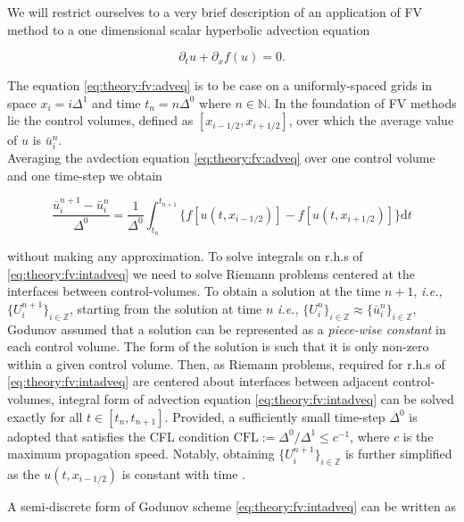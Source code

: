 \documentclass[11pt,a4paper,headinclude=true,DIV=14,BCOR=8mm,chapterprefix,listof=totoc,twoside,openright,abstracton]{scrbook}
\begin{document}
We will restrict ourselves to a very brief description of an application of FV method to a one dimensional scalar hyperbolic advection equation 

\begin{equation}
    \partial_t u + \partial_x f(u) = 0.
    \label{eq:theory:fv:adveq}
\end{equation}

The equation \ref{eq:theory:fv:adveq} is to be case on a uniformly-spaced grids in space $ x_i = i\Delta^1$ and time $t_n = n\Delta^0$ where $n\in\mathbb{N}$. In the foundation of FV methods lie the control volumes, defined as $[x_{i-1/2},x_{i+1/2}]$, over which the average value of $u$ is $\bar{u}_i ^n$. \\
Averaging the avdection equation \ref{eq:theory:fv:adveq} over one control volume and one time-step we obtain

\begin{equation}
    \frac{\bar{u}_{i}^{n+1}-\bar{u}_{i}^{n}}{\Delta^0} = \frac{1}{\Delta^0}\int_{t_n}^{t_{n+1}}\big\{f[u(t,x_{i-1/2})] - f[u(t,x_{i+1/2})]\big\}\text{d}t
    \label{eq:theory:fv:intadveq}
\end{equation}

without making any approximation. To solve integrals on r.h.s of \ref{eq:theory:fv:intadveq} we need to solve Riemann problems centered at the interfaces between control-volumes. To obtain a solution at the time $n+1$, \textit{i.e.,} $\{U_{i}^{n+1}\}_{i\in\mathbb{Z}}$, starting from the solution at time $n$ \textit{i.e.,} $\{U_{i}^{n}\}_{i\in\mathbb{Z}} \approx \{\bar{u}_{i}^{n}\}_{i\in\mathbb{Z}}$, Godunov assumed that a solution can be represented as a \textit{piece-wise constant} in each control volume. The form of the solution is such that it is only non-zero within a given control volume. Then, as Riemann problems, required for r.h.s of \ref{eq:theory:fv:intadveq} are centered about interfaces between adjacent control-volumes, integral form of advection equation \ref{eq:theory:fv:intadveq} can be solved exactly for all $t\in[t_n, t_{n+1}]$. Provided, a sufficiently small time-step $\Delta^0$ is adopted that satisfies the CFL condition $\text{CFL} := \Delta^0 / \Delta^1 \leq c^{-1} $, where $c$ is the maximum propagation speed. Notably, obtaining $\{U^{n+1}_i\}_{i\in\mathbb{Z}}$ is further simplified as the $u(t, x_{i-1/2})$ is constant with time \cite{LeVeque:1992}.

A semi-discrete form of Godunov scheme \ref{eq:theory:fv:intadveq} can be written as 
\end{document}
